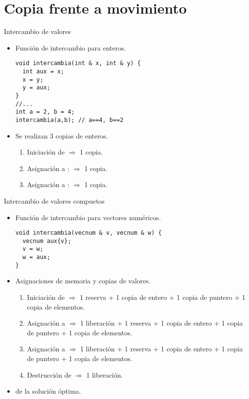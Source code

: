 \section{Copia frente a movimiento}

\begin{frame}[t,fragile]{Intercambio de valores}
\begin{itemize}
  \item Función de intercambio para enteros.
\begin{lstlisting}
void intercambia(int & x, int & y) {
  int aux = x;
  x = y;
  y = aux;
}
//...
int a = 2, b = 4;
intercambia(a,b); // a==4, b==2
\end{lstlisting}

  \item Se realizan 3 copias de enteros.
    \begin{enumerate}
      \item Iniciación de  $\Rightarrow$ 1 copia.
      \item Asignación a : $\Rightarrow$ 1 copia.
      \item Asignación a : $\Rightarrow$ 1 copia.
    \end{enumerate}
\end{itemize}
\end{frame}

\begin{frame}[t,fragile]{Intercambio de valores compuetos}
\begin{itemize}
  \item Función de intercambio para vectores numéricos.
\begin{lstlisting}
void intercambia(vecnum & v, vecnum & w) {
  vecnum aux{v};
  v = w;
  w = aux;
}
\end{lstlisting}

  \item Asignaciones de memoria y copias de valores.
    \begin{enumerate}
      \item Iniciación de  $\Rightarrow$ 
            1 reserva + 
            1 copia de entero + 1 copia de puntero +
            1 copia de elementos.
      \item Asignación a  $\Rightarrow$ 
            1 liberación + 1 reserva + 
            1 copia de entero + 1 copia de puntero +
            1 copia de elementos.
      \item Asignación a  $\Rightarrow$ 
            1 liberación + 1 reserva + 
            1 copia de entero + 1 copia de puntero +
            1 copia de elementos.
      \item Destrucción de  $\Rightarrow$ 1 liberación.
    \end{enumerate}

  \item {} de la solución óptima.
\end{itemize}
\end{frame}

